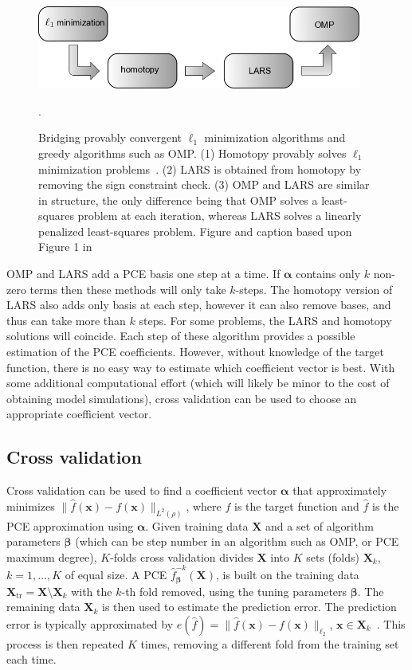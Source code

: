 \begin{figure}[h]
\centering
\includegraphics[width=0.95\textwidth]{images/compressed-sensing-hierarchy.png}
\caption{Bridging provably convergent $\ell_1$ minimization algorithms and greedy 
algorithms such as OMP. (1) Homotopy provably solves $\ell_1$ minimization 
problems~\cite{Efron2004}. (2) LARS is obtained from homotopy by removing
the sign constraint check. (3) OMP and LARS are similar in structure, 
the only difference being that OMP solves a least-squares problem at each iteration,
whereas LARS solves a linearly penalized least-squares problem. 
Figure and caption based upon Figure 1 in~\cite{Donoho2008}}. 
\label{fig:compressed-sensing-method-heirarchy}
\end{figure}

OMP and LARS add a PCE basis one step at a time. If $\boldsymbol{\alpha}$ contains
 only $k$ non-zero terms then these methods will only take $k$-steps. 
The homotopy version of LARS also adds only basis at each step, however 
it can also remove bases, and thus can take more than $k$ steps. For some problems, 
the LARS and homotopy solutions will coincide. Each step of these algorithm provides a possible
estimation of the PCE coefficients. However, without knowledge of the target function, there is no
easy way to estimate which coefficient vector is best. With some additional computational 
effort (which will likely be minor to the cost of obtaining model simulations), cross validation 
can be used to choose an appropriate coefficient vector.

\subsection{Cross validation}

Cross validation can be used to find a coefficient vector $\boldsymbol{\alpha}$ 
that approximately minimizes $\| \hat{f}(\mathbf{x})-f(\mathbf{x})\|_{L^2(\rho)}$, where
$f$ is the target function and $\hat{f}$ is the PCE approximation using $\boldsymbol{\alpha}$. 
Given training data $\mathbf{X}$ and a set of algorithm parameters $\boldsymbol{\beta}$ (which can be step number in an 
algorithm such as OMP, or PCE maximum degree), $K$-folds cross validation divides 
$\mathbf{X}$ into $K$ sets (folds) $\mathbf{X}_k$, $k=1,\ldots,K$ of equal size. 
A PCE $\hat{f}^{-k}_{\boldsymbol{\beta}}(\mathbf{X})$, is built on the training data 
$\mathbf{X}_{\mathrm{tr}}=\mathbf{X} \setminus \mathbf{X}_k$ 
with the $k$-th fold removed, using the tuning parameters $\boldsymbol{\beta}$. 
The remaining data $\mathbf{X}_k$ is then used to estimate the prediction error.
The prediction error is typically approximated by
$e(\hat{f})=\lVert \hat{f}(\mathbf{x})-f(\mathbf{x})\rVert_{\ell_2}$, 
$\mathbf{x}\in\mathbf{X}_{k}$~\cite{hastie2001}. This process is then repeated $K$ times, removing a 
different fold from the training set each time. 

